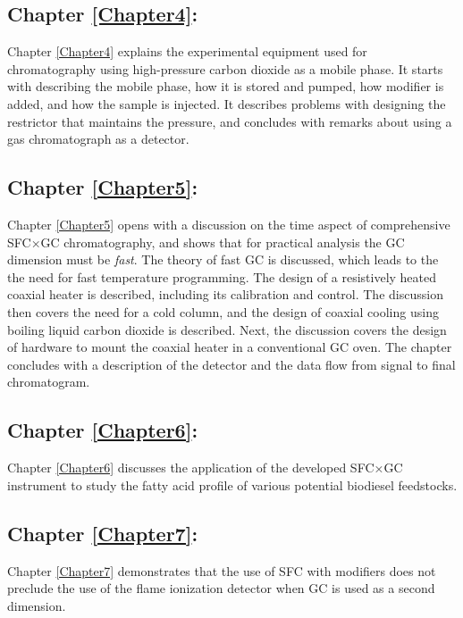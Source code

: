 \subsection{Chapter \ref{Chapter4}:  }

Chapter \ref{Chapter4} explains the experimental equipment used for
chromatography using high-pressure carbon dioxide as a mobile phase. It starts
with describing the mobile phase, how it is stored and pumped, how modifier is
added, and how the sample is injected. It describes problems with designing the
restrictor that maintains the pressure, and concludes with remarks about using a
gas chromatograph as a detector.

\subsection{Chapter \ref{Chapter5}:  }

Chapter \ref{Chapter5} opens with a discussion on the time aspect of
comprehensive SFC×GC chromatography, and shows that for practical analysis the
GC dimension must be \textit{fast}. The theory of fast GC is discussed, which
leads to the the need for fast temperature programming. The design of a
resistively heated coaxial heater is described, including its calibration and
control. The discussion then covers the need for a cold column, and the design
of coaxial cooling using boiling liquid carbon dioxide is described. Next, the
discussion covers the design of hardware to mount the coaxial heater in a
conventional GC oven. The chapter concludes with a description of the detector
and the data flow from signal to final chromatogram.

\subsection{Chapter \ref{Chapter6}:  }

Chapter \ref{Chapter6} discusses the application of the developed SFC×GC
instrument to study the fatty acid profile of various potential biodiesel
feedstocks.

\subsection{Chapter \ref{Chapter7}:  }

Chapter \ref{Chapter7} demonstrates that the use of SFC with modifiers does not
preclude the use of the flame ionization detector when GC is used as a second
dimension.

